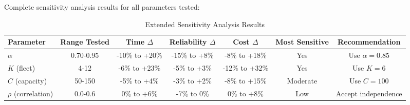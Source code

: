 Complete sensitivity analysis results for all parameters tested:

\begin{table}[H]
\centering
\caption{Extended Sensitivity Analysis Results}
\begin{tabular}{lcccccc}
\toprule
Parameter & Range Tested & Time $\Delta$ & Reliability $\Delta$ & Cost $\Delta$ & Most Sensitive & Recommendation \\
\midrule
$\alpha$ & 0.70-0.95 & -10\% to +20\% & -15\% to +8\% & -8\% to +18\% & Yes & Use $\alpha = 0.85$ \\
$K$ (fleet) & 4-12 & -6\% to +23\% & -5\% to +3\% & -12\% to +32\% & Yes & Use $K = 6$ \\
$C$ (capacity) & 50-150 & -5\% to +4\% & -3\% to +2\% & -8\% to +15\% & Moderate & Use $C = 100$ \\
$\rho$ (correlation) & 0.0-0.6 & 0\% to +6\% & -7\% to 0\% & 0\% to +8\% & Low & Accept independence \\
\bottomrule
\end{tabular}
\end{table}
